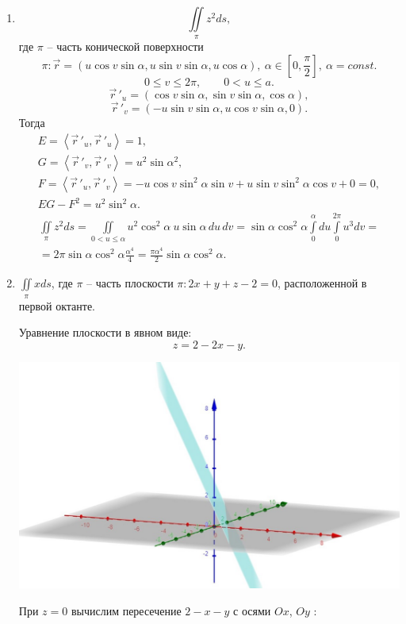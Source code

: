 \documentclass[../../main.tex]{subfiles}
\begin{document}
	\begin{exmps}
	
	\,
	
	\begin{enumerate}
	\item
	\[ \iint \limits_\pi z^2 ds,\] где $\pi$ \--- часть конической 
	поверхности
	\[\pi: \vec{r} = (u\cos v\sin \alpha, u\sin v\sin\alpha, 
	u\cos\alpha) , \ 
	  \alpha\in \left[0, \frac{\pi}{2}\right], \ \alpha = const.\] 
	\[0 \leq v \leq 2\pi, \qquad 0 < u \leq a. \]
	\[\vec r\,'_u = (\cos v \sin \alpha, \sin v \sin \alpha, \cos \alpha), \]
	\[\vec r\,'_v = (-u \sin v \sin \alpha, u \cos v \sin \alpha, 0).  \]
	Тогда
	\begin{gather*}
	E = \left<\vec r\,'_u, \vec r\,'_u\right>= 1, \\ G = \left<\vec r\,'_v, \vec r\,'_v\right> = u^2 \sin \alpha^2, \\
	F = \left<\vec r\,'_u, \vec r\,'_v\right> = -u \cos v \sin^2 \alpha \sin 
	v +
	 u \sin v \sin ^2 \alpha \cos v+0 =0, \\
	EG - F^2 = u^2 \sin^2 \alpha.
	\end{gather*}
	\begin{gather*}
	\iint \limits_\pi z^2 ds = \iint\limits_{0<u \leq \alpha} u^2 \cos^2 \alpha
	 \ u \sin \alpha \,du\, dv = \sin \alpha \cos ^2 \alpha \int \limits_0^\alpha du
	  \int \limits_0 ^{2\pi} u^3 dv = \\ = 2 \pi \sin \alpha \cos ^2 \alpha 
	  \frac{\alpha^4}{4} =
	   \frac{\pi \alpha^4}{2} \sin \alpha \cos^2 \alpha.
	\end{gather*}
	\item 
	$\displaystyle\iint \limits_\pi x ds$, где $\pi$ \--- часть плоскости
	$\pi : 2x+y+z-2=0$, расположенной в первой октанте.
	
	Уравнение плоскости в явном виде:
	\[z = 2 -2x -y.\]
	\begin{center}
	 \includegraphics[scale = 0.2]{lec23-2.jpg}
	\end{center}	
	При $z = 0$ вычислим пересечение $2 -x-y$ с осями $Ox$, $Oy$ :
	

\end{enumerate}
\end{exmps}
\end{document}
